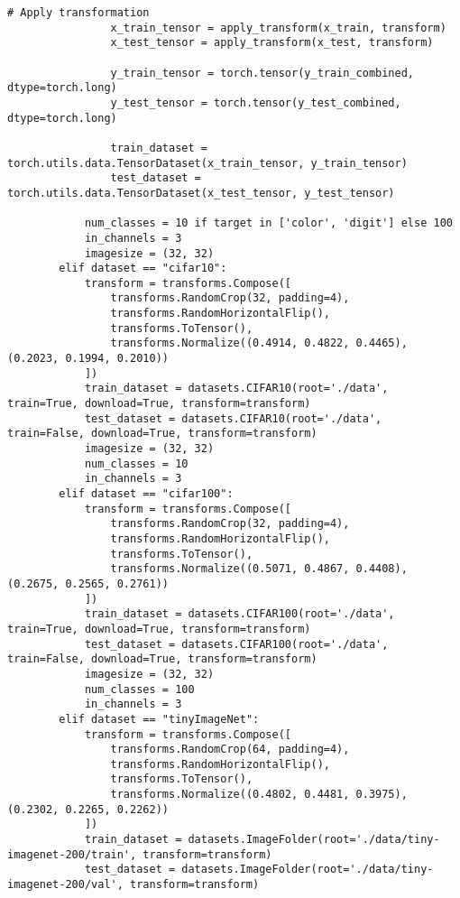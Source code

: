 \begin{lstlisting}[style=pythonstyle, caption={Program Example}]
                # Apply transformation
                x_train_tensor = apply_transform(x_train, transform)
                x_test_tensor = apply_transform(x_test, transform)
                
                y_train_tensor = torch.tensor(y_train_combined, dtype=torch.long)
                y_test_tensor = torch.tensor(y_test_combined, dtype=torch.long)
                
                train_dataset = torch.utils.data.TensorDataset(x_train_tensor, y_train_tensor)
                test_dataset = torch.utils.data.TensorDataset(x_test_tensor, y_test_tensor)
        
            num_classes = 10 if target in ['color', 'digit'] else 100
            in_channels = 3
            imagesize = (32, 32)
        elif dataset == "cifar10":
            transform = transforms.Compose([
                transforms.RandomCrop(32, padding=4),
                transforms.RandomHorizontalFlip(),
                transforms.ToTensor(),
                transforms.Normalize((0.4914, 0.4822, 0.4465), (0.2023, 0.1994, 0.2010))
            ])
            train_dataset = datasets.CIFAR10(root='./data', train=True, download=True, transform=transform)
            test_dataset = datasets.CIFAR10(root='./data', train=False, download=True, transform=transform)
            imagesize = (32, 32)
            num_classes = 10
            in_channels = 3
        elif dataset == "cifar100":
            transform = transforms.Compose([
                transforms.RandomCrop(32, padding=4),
                transforms.RandomHorizontalFlip(),
                transforms.ToTensor(),
                transforms.Normalize((0.5071, 0.4867, 0.4408), (0.2675, 0.2565, 0.2761))
            ])
            train_dataset = datasets.CIFAR100(root='./data', train=True, download=True, transform=transform)
            test_dataset = datasets.CIFAR100(root='./data', train=False, download=True, transform=transform)
            imagesize = (32, 32)
            num_classes = 100
            in_channels = 3
        elif dataset == "tinyImageNet":
            transform = transforms.Compose([
                transforms.RandomCrop(64, padding=4),
                transforms.RandomHorizontalFlip(),
                transforms.ToTensor(),
                transforms.Normalize((0.4802, 0.4481, 0.3975), (0.2302, 0.2265, 0.2262))
            ])
            train_dataset = datasets.ImageFolder(root='./data/tiny-imagenet-200/train', transform=transform)
            test_dataset = datasets.ImageFolder(root='./data/tiny-imagenet-200/val', transform=transform)

\end{lstlisting}
